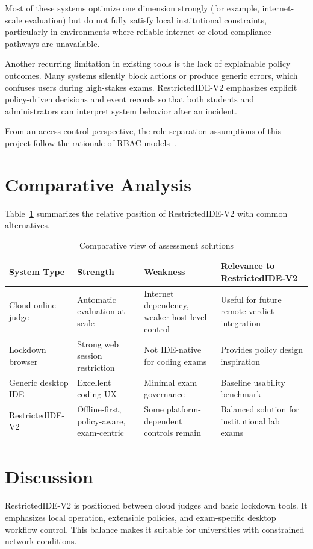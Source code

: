 \documentclass[12pt,a4paper]{report}
\begin{document}
	Most of these systems optimize one dimension strongly (for example, internet-scale evaluation) but do not fully satisfy local institutional constraints, particularly in environments where reliable internet or cloud compliance pathways are unavailable.
	
	Another recurring limitation in existing tools is the lack of explainable policy outcomes. Many systems silently block actions or produce generic errors, which confuses users during high-stakes exams. RestrictedIDE-V2 emphasizes explicit policy-driven decisions and event records so that both students and administrators can interpret system behavior after an incident.
	
	From an access-control perspective, the role separation assumptions of this project follow the rationale of RBAC models~\cite{rbac}.
	
	\section{Comparative Analysis}
	Table~\ref{tab:comparison} summarizes the relative position of RestrictedIDE-V2 with common alternatives.
	
	\begin{table}[htbp]
		\centering
		\caption{Comparative view of assessment solutions}\label{tab:comparison}
		\begin{tabular}{|p{}|p{}|p{}|p{}|}
			\hline
			\textbf{System Type} & \textbf{Strength} & \textbf{Weakness} & \textbf{Relevance to RestrictedIDE-V2} \\
			\hline
			Cloud online judge & Automatic evaluation at scale & Internet dependency, weaker host-level control & Useful for future remote verdict integration \\
			\hline
			Lockdown browser & Strong web session restriction & Not IDE-native for coding exams & Provides policy design inspiration \\
			\hline
			Generic desktop IDE & Excellent coding UX & Minimal exam governance & Baseline usability benchmark \\
			\hline
			RestrictedIDE-V2 & Offline-first, policy-aware, exam-centric & Some platform-dependent controls remain & Balanced solution for institutional lab exams \\
			\hline
		\end{tabular}
	\end{table}
	
	\section{Discussion}
	RestrictedIDE-V2 is positioned between cloud judges and basic lockdown tools. It emphasizes local operation, extensible policies, and exam-specific desktop workflow control. This balance makes it suitable for universities with constrained network conditions.
	
\end{document}
